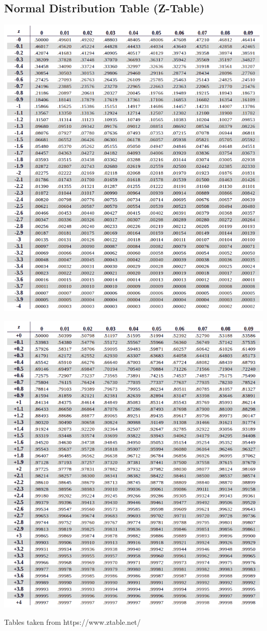 \documentclass[12pt,letterpaper]{article} \usepackage{amsmath} \usepackage{graphicx} \usepackage[margin=1in]{geometry} \usepackage{longtable}  \usepackage{amssymb}
\begin{document}
	\subsection {Normal Distribution Table (Z-Table)}
	\begin{center}
		\includegraphics[width=0.99\linewidth]{negativeztable}
	\end{center}
	\begin{center}
		\includegraphics[width=0.99\linewidth]{positiveztable}
	\end{center}
	Tables taken from https://www.ztable.net/
	
\end{document}
